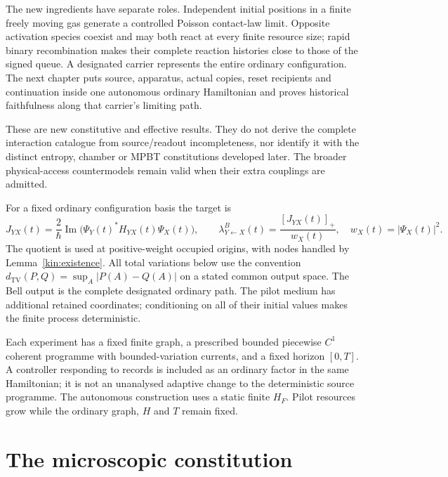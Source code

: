 \documentclass[11pt,oneside,openany]{book}
\theoremstyle{definition}
\theoremstyle{remark}\newtheorem{remark}[theorem]{Remark}
\providecommand{\TV}{d_{\mathrm{TV}}}
\begin{document}
The new ingredients have separate roles.  Independent initial positions
in a finite freely moving gas generate a controlled Poisson contact-law
limit.  Opposite activation species coexist and may both react at every
finite resource size; rapid binary recombination makes their complete
reaction histories close to those of the signed queue.  A designated
carrier represents the entire ordinary configuration.  The next chapter
puts source, apparatus, actual copies, reset recipients and continuation
inside one autonomous ordinary Hamiltonian and proves historical
faithfulness along that carrier's limiting path.

These are new constitutive and effective results.  They do not derive
the complete interaction catalogue from source/readout incompleteness,
nor identify it with the distinct entropy, chamber or MPBT constitutions
developed later.  The broader physical-access countermodels remain valid
when their extra couplings are admitted.

For a fixed ordinary configuration basis the target is
\begin{equation}\label{p:target}
 J_{YX}(t)=\frac{2}{\hbar}\operatorname{Im}
     \bigl(\Psi_Y(t)^*H_{YX}(t)\Psi_X(t)\bigr),\qquad
 \lambda^B_{Y\leftarrow X}(t)=\frac{[J_{YX}(t)]_+}{w_X(t)},
 \quad w_X(t)=|\Psi_X(t)|^2.
\end{equation}
The quotient is used at positive-weight occupied origins, with nodes
handled by Lemma~\ref{kin:existence}.  All total variations below use the
convention $\TV(P,Q)=\sup_A|P(A)-Q(A)|$ on a stated common output space.
The Bell output is the complete designated ordinary path.  The pilot
medium has additional retained coordinates; conditioning on all of their
initial values makes the finite process deterministic.

Each experiment has a fixed finite graph, a prescribed bounded piecewise
$C^1$ coherent programme with bounded-variation currents, and a fixed
horizon $[0,T]$.  A controller responding to records is included as an
ordinary factor in the same Hamiltonian; it is not an unanalysed adaptive
change to the deterministic source programme.  The autonomous
construction uses a static finite $H_F$.  Pilot resources grow while
the ordinary graph, $H$ and $T$ remain fixed.

\section{The microscopic constitution}
\end{document}
